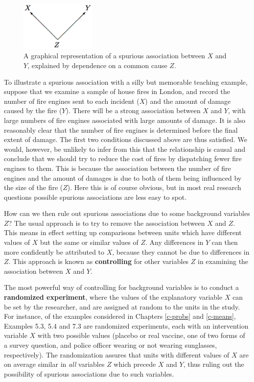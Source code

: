 \documentclass[11pt,a4paper,openany]{book}
\begin{document}
\begin{figure}[htbp]
\centering
\includegraphics[width=3.70000cm]{xyzspurious.pdf}
\caption{\label{fig:f-xyzspurious} A graphical representation of a spurious
association between \(X\) and \(Y\), explained by dependence on a common
cause \(Z\).}
\end{figure}

To illustrate a spurious association with a silly but memorable teaching
example, suppose that we examine a sample of house fires in London, and
record the number of fire engines sent to each incident (\(X\)) and the
amount of damage caused by the fire (\(Y\)). There will be a strong
association between \(X\) and \(Y\), with large numbers of fire engines
associated with large amounts of damage. It is also reasonably clear
that the number of fire engines is determined before the final extent of
damage. The first two conditions discussed above are thus satisfied. We
would, however, be unlikely to infer from this that the relationship is
causal and conclude that we should try to reduce the cost of fires by
dispatching fewer fire engines to them. This is because the association
between the number of fire engines and the amount of damages is due to
both of them being influenced by the size of the fire (\(Z\)). Here this
is of course obvious, but in most real research questions possible
spurious associations are less easy to spot.

How can we then rule out spurious associations due to some background
variables \(Z\)? The usual approach is to try to remove the association
between \(X\) and \(Z\). This means in effect setting up comparisons
between units which have different values of \(X\) but the same or
similar values of \(Z\). Any differences in \(Y\) can then more
confidently be attributed to \(X\), because they cannot be due to
differences in \(Z\). This approach is known as \textbf{controlling} for
other variables \(Z\) in examining the association between \(X\) and
\(Y\).

The most powerful way of controlling for background variables is to
conduct a \textbf{randomized experiment}, where the values of the
explanatory variable \(X\) can be set by the researcher, and are
assigned at random to the units in the study. For instance, of the
examples considered in Chapters \ref{c-probs} and \ref{c-means},
Examples 5.3, 5.4 and 7.3 are randomized experiments, each with an
intervention variable \(X\) with two possible values (placebo or real
vaccine, one of two forms of a survey question, and police officer
wearing or not wearing sunglasses, respectively). The randomization
assures that units with different values of \(X\) are on average similar
in \emph{all} variables \(Z\) which precede \(X\) and \(Y\), thus ruling
out the possibility of spurious associations due to such variables.
\end{document}
